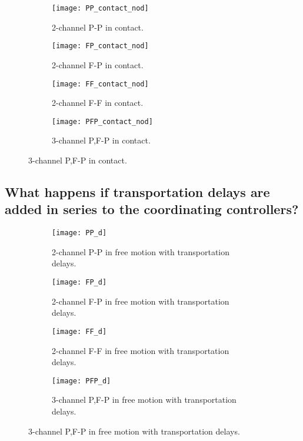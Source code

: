 \newpage

\begin{figure}[H]
\begin{minipage}{0.5\textwidth}
\begin{figure}[H]
\centering
\texttt{[image: PP\_contact\_nod]}
\caption{2-channel P-P in contact.}
\label{fig:pp_contact}
\end{figure}
\begin{figure}[H]
\centering
\texttt{[image: FP\_contact\_nod]}
\caption{2-channel F-P in contact.}
\label{fig:fp_contact}
\end{figure}
\end{minipage}
\begin{minipage}{0.5\textwidth}
\begin{figure}[H]
\centering
\texttt{[image: FF\_contact\_nod]}
\caption{2-channel F-F in contact.}
\label{fig:ff_contact}
\end{figure}
\begin{figure}[H]
\centering
\texttt{[image: PFP\_contact\_nod]}
\caption{3-channel P,F-P in contact.}
\label{fig:pfp_contact}
\end{figure}
\end{minipage}
\end{figure}

\newpage

\subsection{What happens if transportation delays are added in series to the coordinating controllers?}

\begin{figure}[H]
\begin{minipage}{0.5\textwidth}
\begin{figure}[H]
\centering
\texttt{[image: PP\_d]}
\caption{2-channel P-P in free motion with transportation delays.}
\label{fig:pp_d}
\end{figure}
\begin{figure}[H]
\centering
\texttt{[image: FP\_d]}
\caption{2-channel F-P in free motion with transportation delays.}
\label{fig:fp_d}
\end{figure}
\end{minipage}
\begin{minipage}{0.5\textwidth}
\begin{figure}[H]
\centering
\texttt{[image: FF\_d]}
\caption{2-channel F-F in free motion with transportation delays.}
\label{fig:ff_d}
\end{figure}
\begin{figure}[H]
\centering
\texttt{[image: PFP\_d]}
\caption{3-channel P,F-P in free motion with transportation delays.}
\label{fig:pfp_d}
\end{figure}
\end{minipage}
\end{figure}

